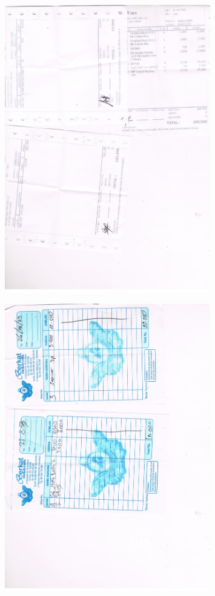 \documentclass{article} %
\begin{document}
	\begin{figure}[H]
		\centering
		\includegraphics[width=0.8\textwidth]{images/komponen3}
	\end{figure}

	\begin{figure}[H]
		\centering
		\includegraphics[width=0.8\textwidth]{images/komponen4}
	\end{figure}
\end{document}
